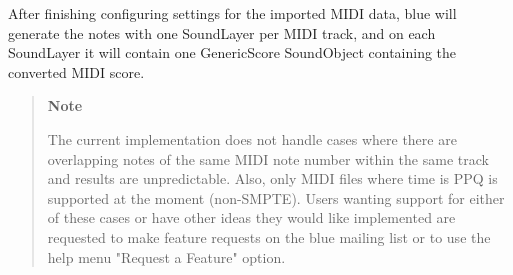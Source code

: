 After finishing configuring settings for the imported MIDI data, blue
will generate the notes with one SoundLayer per MIDI track, and on each
SoundLayer it will contain one GenericScore SoundObject containing the
converted MIDI score.

\begin{quote}
\textbf{Note}

The current implementation does not handle cases where there are
overlapping notes of the same MIDI note number within the same track and
results are unpredictable. Also, only MIDI files where time is PPQ is
supported at the moment (non-SMPTE). Users wanting support for either of
these cases or have other ideas they would like implemented are
requested to make feature requests on the blue mailing list or to use
the help menu "Request a Feature" option.
\end{quote}
